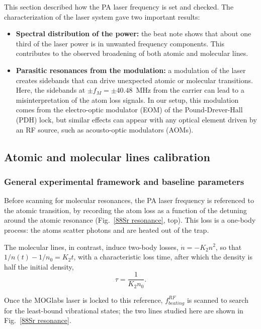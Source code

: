 This section described how the PA laser frequency is set and checked. The characterization of the laser system
gave two important results:
\begin{itemize}
    \item \textbf{Spectral distribution of the power:} the beat note shows that about one third
    of the laser power is in unwanted frequency components. This contributes to the observed broadening of both
    atomic and molecular lines.

    \item \textbf{Parasitic resonances from the modulation:} a modulation of the laser creates sidebands that can drive unexpected atomic or molecular transitions.
    Here, the sidebands at $\pm f_M = \pm 40.48$~MHz from the carrier can lead to a misinterpretation of the atom loss signals. In our setup, this modulation
    comes from the electro-optic modulator (EOM) of the Pound-Drever-Hall (PDH) lock, but similar effects can appear with any optical element
    driven by an RF source, such as acousto-optic modulators (AOMs).
\end{itemize}
\subsection{Atomic and molecular lines calibration}
\subsubsection{General experimental framework and baseline parameters}
\label{sec:88Sr_framework}

Before scanning for molecular resonances, the PA laser frequency is referenced to the atomic
transition, by recording the atom loss as a function of the detuning around the atomic
resonance (Fig.~\ref{88Sr resonance}, top). This loss is a one-body process: the atoms scatter
photons and are heated out of the trap.

The molecular lines, in contrast, induce two-body losses, $\dot n=-K_2n^2$, so that
$1/n(t)-1/n_0=K_2t$, with a characteristic loss time, after which the density is half the initial density,
\begin{equation}
\tau = \frac{1}{K_2 n_0}.
\label{temps caractéristique}
\end{equation}

Once the MOGlabs laser is locked to this reference, $f^{RF}_{beating}$ is
scanned to search for the least-bound vibrational states; the two lines studied here are shown in
Fig.~\ref{88Sr resonance}.

